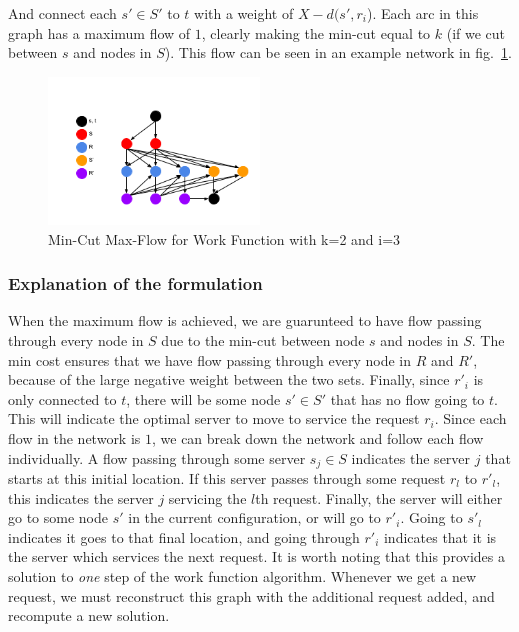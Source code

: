 And connect each $s' \in S'$ to $t$ with a weight of $X-d(s', r_i$). Each arc in this graph has a maximum flow of $1$, clearly making the min-cut equal to $k$ (if we cut between $s$ and nodes in $S$). This flow can be seen in an example network in fig.~\ref{fig:mcfp}.

\begin{figure}[h]
    \centering
    \includegraphics[width=0.5\textwidth]{images/mcfp.png}
    \caption{Min-Cut Max-Flow for Work Function with k=2 and i=3}
    \label{fig:mcfp}
\end{figure}

\subsubsection*{Explanation of the formulation}
When the maximum flow is achieved, we are guarunteed to have flow passing through every node in $S$ due to the min-cut between node $s$ and nodes in $S$. The min cost ensures that we have flow passing through every node in $R$ and $R'$, because of the large negative weight between the two sets. Finally, since $r'_i$ is only connected to $t$, there will be some node $s' \in S'$ that has no flow going to $t$. This will indicate the optimal server to move to service the request $r_i$. Since each flow in the network is $1$, we can break down the network and follow each flow individually. A flow passing through some server $s_j \in S$ indicates the server $j$ that starts at this initial location. If this server passes through some request $r_l$ to $r'_l$, this indicates the server $j$ servicing the $l$th request. Finally, the server will either go to some node $s'$ in the current configuration, or will go to $r'_i$. Going to $s'_l$ indicates it goes to that final location, and going through $r'_i$ indicates that it is the server which services the next request. It is worth noting that this provides a solution to \textit{one} step of the work function algorithm. Whenever we get a new request, we must reconstruct this graph with the additional request added, and recompute a new solution.

